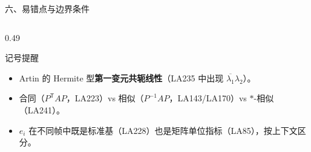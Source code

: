 \documentclass[aspectratio=169,10pt,fontset=none]{ctexbeamer}
\begin{document}
\begin{frame}[t]{六、易错点与边界条件}
\begin{columns}[T,onlytextwidth]
\begin{column}{0.49\textwidth}
      \begin{block}{\footnotesize 记号提醒}
        \scriptsize
        \begin{itemize}\setlength{\itemsep}{1pt}
          \item Artin 的 Hermite 型\textbf{第一变元共轭线性}（LA235 中出现 $\overline{\lambda_1}\lambda_2$）。
          \item 合同（$P^{\mathsf T}AP$，LA223）vs 相似（$P^{-1}AP$，LA143/LA170）vs $*$-相似（LA241）。
          \item $e_i$ 在不同帧中既是标准基（LA228）也是矩阵单位指标（LA85），按上下文区分。
        \end{itemize}
      \end{block}
    \end{column}
  \end{columns}
\end{frame}
\end{document}
